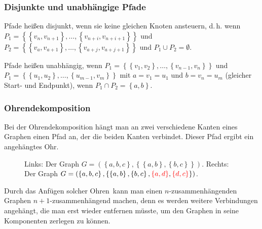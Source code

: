\documentclass{scrartcl}
\begin{document}
\subsubsection{Disjunkte und unabhängige Pfade}

Pfade heißen disjunkt, wenn sie keine gleichen Knoten ansteuern, d.\,h. wenn $P_1 = \left\{\left\{v_n, v_{n + 1}\right\}, \dots, \left\{v_{n + i}, v_{n + i + 1}\right\}\right\}$
und $P_2 = \left\{\left\{v_a, v_{a + 1}\right\}, \dots, \left\{v_{a + j}, v_{a + j + 1}\right\}\right\}$ und
$P_1 \cup P_2 = \emptyset$.

Pfade heißen unabhängig, wenn $P_1 = \left\{\left\{v_1, v_2\right\}, \dots, \left\{v_{n - 1}, v_n\right\}\right\}$ und
$P_1 = \left\{\left\{u_1, u_2\right\}, \dots, \left\{u_{m - 1}, v_m\right\}\right\}$ mit $a = v_1 = u_1$ und $b = v_n = u_m$ (gleicher
Start- und Endpunkt), wenn $P_1 \cap P_2 = \left\{a, b\right\}$.

\subsubsection{Ohrendekomposition}

Bei der Ohrendekomposition hängt man an zwei verschiedene Kanten eines Graphen 
einen Pfad an, der die beiden Kanten verbindet. Dieser Pfad ergibt ein angehängtes
\frq Ohr\flq.

\begin{figure}[h!]
\centering
\begin{subfigure}{.5\textwidth}
\end{subfigure}%
\begin{subfigure}{.5\textwidth}
\end{subfigure}
\caption{Links: Der Graph $G = \left(\left\{a, b, c\right\},
	\left\{
		\left\{a, b\right\}, 
		\left\{b, c\right\}
	\right\}
	\right)$. Rechts: Der Graph $G = \left(\left\{a, b, c\right\},
	\left\{
		\left\{a, b\right\}, 
		\left\{b, c\right\},
		\textcolor{red}{\left\{a, d\right\}},
		\textcolor{red}{\left\{d, c\right\}}
	\right\}
	\right)$.}
\label{ohrendekomposition}
\end{figure}

Durch das Anfügen solcher \frq Ohren\flq\ kann man einen $n$-zusammenhängenden Graphen $n + 1$-zusammenhängend machen, denn es werden weitere Verbindungen angehängt, die man
erst wieder entfernen müsste, um den Graphen in seine Komponenten zerlegen zu können.
\end{document}
